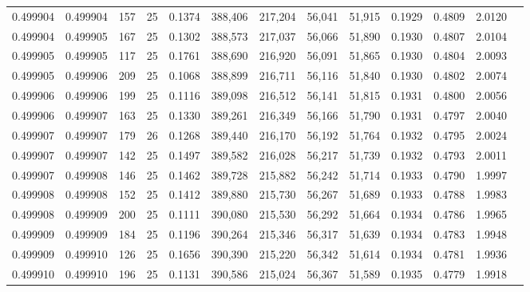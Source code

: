 \begin{tabular}{rrrrrrrrrrrrr}
0.499904 & 0.499904 & 157 &  25 &                                     0.1374 & 388,406 & 217,204 &  56,041 &  51,915 & 0.1929 & 0.4809 & 2.0120 \\
0.499904 & 0.499905 & 167 &  25 &                                     0.1302 & 388,573 & 217,037 &  56,066 &  51,890 & 0.1930 & 0.4807 & 2.0104 \\
0.499905 & 0.499905 & 117 &  25 &                                     0.1761 & 388,690 & 216,920 &  56,091 &  51,865 & 0.1930 & 0.4804 & 2.0093 \\
0.499905 & 0.499906 & 209 &  25 &                                     0.1068 & 388,899 & 216,711 &  56,116 &  51,840 & 0.1930 & 0.4802 & 2.0074 \\
0.499906 & 0.499906 & 199 &  25 &                                     0.1116 & 389,098 & 216,512 &  56,141 &  51,815 & 0.1931 & 0.4800 & 2.0056 \\
0.499906 & 0.499907 & 163 &  25 &                                     0.1330 & 389,261 & 216,349 &  56,166 &  51,790 & 0.1931 & 0.4797 & 2.0040 \\
0.499907 & 0.499907 & 179 &  26 &                                     0.1268 & 389,440 & 216,170 &  56,192 &  51,764 & 0.1932 & 0.4795 & 2.0024 \\
0.499907 & 0.499907 & 142 &  25 &                                     0.1497 & 389,582 & 216,028 &  56,217 &  51,739 & 0.1932 & 0.4793 & 2.0011 \\
0.499907 & 0.499908 & 146 &  25 &                                     0.1462 & 389,728 & 215,882 &  56,242 &  51,714 & 0.1933 & 0.4790 & 1.9997 \\
0.499908 & 0.499908 & 152 &  25 &                                     0.1412 & 389,880 & 215,730 &  56,267 &  51,689 & 0.1933 & 0.4788 & 1.9983 \\
0.499908 & 0.499909 & 200 &  25 &                                     0.1111 & 390,080 & 215,530 &  56,292 &  51,664 & 0.1934 & 0.4786 & 1.9965 \\
0.499909 & 0.499909 & 184 &  25 &                                     0.1196 & 390,264 & 215,346 &  56,317 &  51,639 & 0.1934 & 0.4783 & 1.9948 \\
0.499909 & 0.499910 & 126 &  25 &                                     0.1656 & 390,390 & 215,220 &  56,342 &  51,614 & 0.1934 & 0.4781 & 1.9936 \\
0.499910 & 0.499910 & 196 &  25 &                                     0.1131 & 390,586 & 215,024 &  56,367 &  51,589 & 0.1935 & 0.4779 & 1.9918 \\

\end{tabular}
